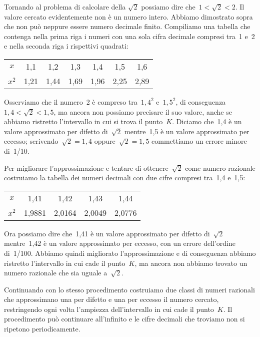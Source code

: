 Tornando al problema di calcolare della \(\sqrt{2}\) possiamo dire 
che~\(1<\sqrt{2}<2\). 
Il valore cercato evidentemente non è un numero intero. 
Abbiamo dimostrato sopra che non può neppure essere
numero decimale finito.
Compiliamo una tabella che contenga nella prima
riga i numeri con una sola cifra decimale compresi tra~1 e~2 e nella
seconda riga i rispettivi quadrati:

\begin{center}
\begin{tabular}{ccccccc}
\toprule
\(x\) & 1,1 & 1,2 & 1,3 & 1,4 & 1,5 & 1,6\\
\(x^{2}\) & 1,21 & 1,44 & 1,69 & 1,96 & 2,25 & 2,89\\
\bottomrule
\end{tabular}
\end{center}

Osserviamo che il numero~2 è compreso tra~\(1,4^{2}\) e~\(1,5^{2}\),
di conseguenza~\(1,4<\sqrt{2}<1,5\), ma ancora
non possiamo precisare il suo valore, anche se abbiamo ristretto
l'intervallo in cui si trova il punto~\(K\). Diciamo che~1,4 è un valore 
approssimato per
difetto di~\(\sqrt{2}\) mentre~1,5
è un valore approssimato per eccesso; scrivendo~\(\sqrt{2}=1,4\)
oppure~\(\sqrt{2}=1,5\) commettiamo un errore minore di~1/10.

Per migliorare l'approssimazione e tentare di ottenere~\(\sqrt{2}\)
come numero razionale costruiamo la tabella dei numeri
decimali con due cifre compresi tra~1,4 e~1,5:

\begin{center}
\begin{tabular}{ccccc}
\toprule
\(x\) &1,41 &1,42 &1,43 &1,44\\
\(x^{2}\) & 1,9881 & 2,0164 & 2,0049 & 2,0776\\
\bottomrule
\end{tabular}
\end{center}

Ora possiamo dire che~1,41 è un valore approssimato per difetto 
di~\(\sqrt{2}\) mentre~1,42 è un valore approssimato
per eccesso, con un errore dell'ordine di~1/100. Abbiamo quindi migliorato
l'approssimazione e di conseguenza abbiamo ristretto l'intervallo in cui 
cade il punto~\(K\), ma ancora non abbiamo trovato un numero razionale che 
sia uguale a~\(\sqrt{2}\).

Continuando con lo stesso procedimento costruiamo due classi di numeri 
razionali che approssimano una per difetto e
una per eccesso il numero cercato, restringendo ogni volta l'ampiezza 
dell'intervallo in cui cade il punto~\(K\).
Il procedimento può continuare all'infinito e le cifre decimali che 
troviamo non si ripetono periodicamente.

